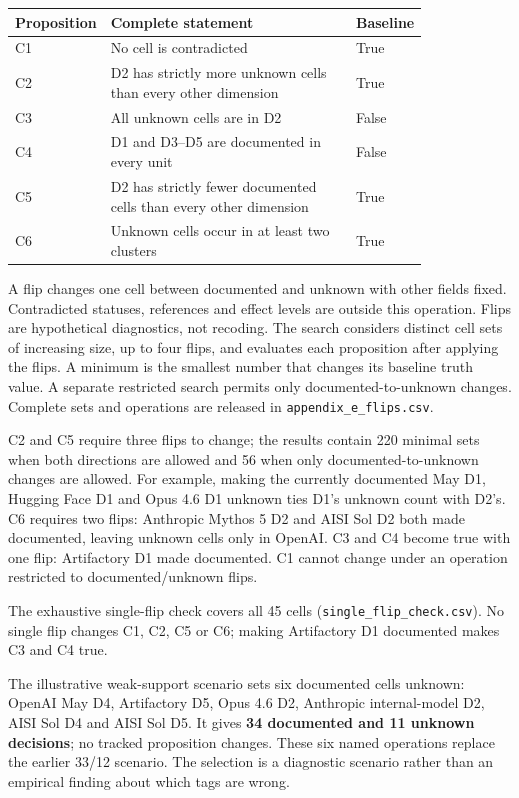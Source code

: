 \documentclass[conference]{IEEEtran}
\begin{document}
\begin{table}[t]\centering\small
\setlength{\tabcolsep}{4pt}
\begin{tabular}{>{\raggedright\arraybackslash}p{0.119\linewidth}>{\raggedright\arraybackslash}p{0.706\linewidth}l}
\toprule
Proposition & Complete statement & Baseline \\
\midrule
C1 & No cell is contradicted & True \\
C2 & D2 has strictly more unknown cells than every other dimension & True \\
C3 & All unknown cells are in D2 & False \\
C4 & D1 and D3--D5 are documented in every unit & False \\
C5 & D2 has strictly fewer documented cells than every other dimension & True \\
C6 & Unknown cells occur in at least two clusters & True \\
\bottomrule
\end{tabular}
\end{table}

A flip changes one cell between documented and unknown with other fields fixed. Contradicted statuses, references and effect levels are outside this operation. Flips are hypothetical diagnostics, not recoding. The search considers distinct cell sets of increasing size, up to four flips, and evaluates each proposition after applying the flips. A minimum is the smallest number that changes its baseline truth value. A separate restricted search permits only documented-to-unknown changes. Complete sets and operations are released in \texttt{appendix\_e\_flips.csv}.

C2 and C5 require three flips to change; the results contain 220 minimal sets when both directions are allowed and 56 when only documented-to-unknown changes are allowed. For example, making the currently documented May D1, Hugging Face D1 and Opus 4.6 D1 unknown ties D1's unknown count with D2's. C6 requires two flips: Anthropic Mythos 5 D2 and AISI Sol D2 both made documented, leaving unknown cells only in OpenAI. C3 and C4 become true with one flip: Artifactory D1 made documented. C1 cannot change under an operation restricted to documented/unknown flips.

The exhaustive single-flip check covers all 45 cells (\texttt{single\_flip\_check.csv}). No single flip changes C1, C2, C5 or C6; making Artifactory D1 documented makes C3 and C4 true.

The illustrative weak-support scenario sets six documented cells unknown: OpenAI May D4, Artifactory D5, Opus 4.6 D2, Anthropic internal-model D2, AISI Sol D4 and AISI Sol D5. It gives \textbf{34 documented and 11 unknown decisions}; no tracked proposition changes. These six named operations replace the earlier 33/12 scenario. The selection is a diagnostic scenario rather than an empirical finding about which tags are wrong.
\end{document}
